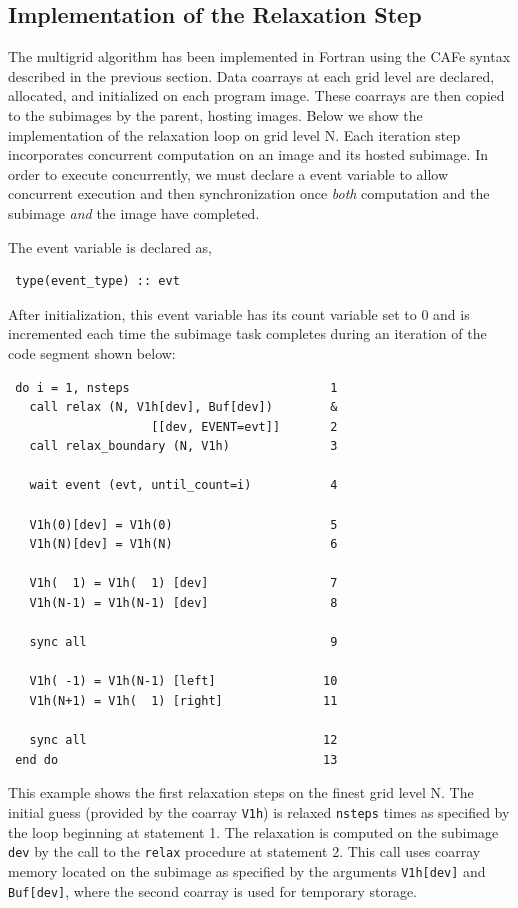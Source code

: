 \subsection{Implementation of the Relaxation Step}

The multigrid algorithm has been implemented in Fortran using the CAFe
syntax described in the previous section. Data coarrays at each grid
level are declared, allocated, and initialized on each program image.
These coarrays are then copied to the subimages by the parent, hosting
images.  Below we show the implementation of the relaxation loop on
grid level N.  Each iteration step incorporates concurrent computation
on an image and its hosted subimage.  In order to execute
concurrently, we must declare a event variable to allow concurrent
execution and then synchronization once \emph{both} computation and
the subimage \emph{and} the image have completed.

The event variable is declared as,
\small
\begin{verbatim}
 type(event_type) :: evt
\end{verbatim}
\normalsize
After initialization, this event variable has its count variable set to 0 and is incremented
each time the subimage task completes during an iteration of the code segment shown below:
\small
\begin{verbatim}
 do i = 1, nsteps                            1
   call relax (N, V1h[dev], Buf[dev])        &
                    [[dev, EVENT=evt]]       2
   call relax_boundary (N, V1h)              3

   wait event (evt, until_count=i)           4

   V1h(0)[dev] = V1h(0)                      5
   V1h(N)[dev] = V1h(N)                      6

   V1h(  1) = V1h(  1) [dev]                 7
   V1h(N-1) = V1h(N-1) [dev]                 8

   sync all                                  9

   V1h( -1) = V1h(N-1) [left]               10
   V1h(N+1) = V1h(  1) [right]              11

   sync all                                 12
 end do                                     13
\end{verbatim}
\normalsize

This example shows the first relaxation steps on the finest grid level N.  The initial
guess (provided by the coarray \texttt{V1h}) is relaxed \texttt{nsteps} times as
specified by the loop beginning at statement 1.  The relaxation is computed on
the subimage \texttt{dev} by the call to the \texttt{relax} procedure at statement 2.
This call uses coarray memory located on the subimage as specified by the arguments
\texttt{V1h[dev]} and \texttt{Buf[dev]}, where the second coarray is used for temporary
storage.

